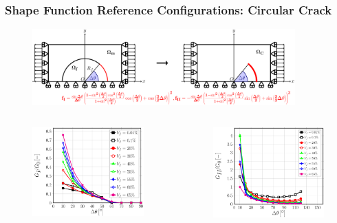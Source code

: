 \documentclass[first,firstsupp,lastsupp,last,hyperref,table]{ETHclass}
\begin{document}
\begin{frame}
\frametitle{\vspace{0.4cm}\footnotesize Shape Function Reference Configurations: Circular Crack}
\vspace{-1.25cm}
\centering
\begin{figure}
\includegraphics[width=0.9\textwidth]{RUCcurvedcrack.pdf}
\end{figure}
\vspace{-0.75cm}
\begin{columns}[c]
\begin{column}{0.5\textwidth}
\centering
\begin{figure}
\centering
\includegraphics[width=0.9\columnwidth]{GI-free-curvedcrack.pdf}
\end{figure}
\end{column}
\begin{column}{0.5\textwidth}
\centering
\begin{figure}
\centering
\includegraphics[width=0.9\columnwidth]{GII-free-curvedcrack.pdf}

\end{figure}
\end{column}
\end{columns}
\end{frame}
\end{document}

